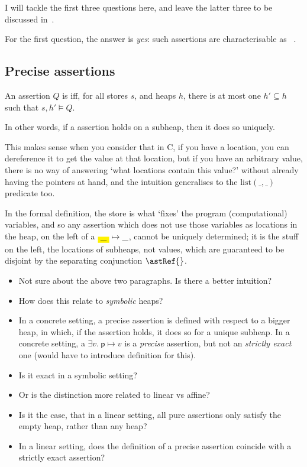 I will tackle the first three questions here, and leave the latter three
to be discussed in~.

For the first question, the answer is \emph{yes}: such assertions are
characterisable as ~.

\subsection{Precise assertions}\label{subsec:precise-assertion}

\begin{definition}%
\label{def:precise-assertion}
    \AP{} An assertion $Q$ is  iff, for all stores $s$, and heaps
    $h$, there is at most one $h' \subseteq{} h$ such that $s , h' \vDash{} Q$.

    In other words, if a  assertion holds on a subheap, then it
    does so uniquely.
\end{definition}

This makes sense when you consider that in C, if you have a location, you can
dereference it to get the value at that location, but if you have an arbitrary
value, there is no way of answering `what locations contain this
value?'
without already having the pointers at hand, and the intuition generalises to
the $\mathrm{list}(\_, \_)$ predicate too.

In the formal definition, the store is what `fixes' the program (computational)
variables, and so any assertion which does not use those variables as locations
in the heap, on the left of a $\colorbox{yellow}{\_} \mapsto{} \_$, cannot be
uniquely determined; it is the stuff on the left, the locations of subheaps,
not values, which are guaranteed to be disjoint by the separating conjunction
$\astRef{}$.

\begin{itemize}
    \item Not sure about the above two paragraphs. Is there a better intuition?
    \item How does this relate to \emph{symbolic} heaps?
    \item In a concrete setting, a precise assertion is defined with respect to
        a bigger heap, in which, if the assertion holds, it does so for a
        unique subheap. In a concrete setting, a $\exists v.\ \mathsf{p}
        \mapsto{} v$ is a \emph{precise} assertion, but not an \emph{strictly
        exact} one (would have to introduce definition for this).
    \item Is it exact in a symbolic setting?
    \item Or is the distinction more related to linear vs affine?
    \item Is it the case, that in a linear setting, all pure assertions only
        satisfy the empty heap, rather than any heap?
    \item In a linear setting, does the definition of a precise assertion
        coincide with a strictly exact assertion?
\end{itemize}


